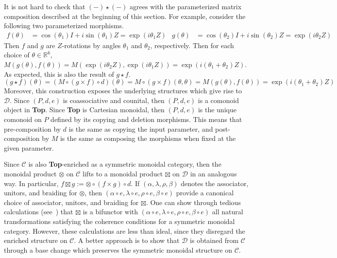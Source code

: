 It is not hard to check that $( - ) \star ( - )$ agrees with the parameterized matrix composition described at the beginning of this section.
For example, consider the following two parameterized morphisms.
\begin{align*}
    f( \theta ) &= \cos( \theta_1 ) I + i \sin( \theta_1 ) Z = \exp( i\theta_1 Z )
    &
    g( \theta ) &= \cos( \theta_2 ) I + i \sin( \theta_2 ) Z = \exp( i\theta_2 Z )
\end{align*}
Then $f$ and $g$ are $Z$-rotations by angles $\theta_1$ and $\theta_2$, respectively.
Then for each choice of $\theta \in \mathbb{R}^6$, $M( g( \theta ), f( \theta ) ) = M( \exp( i\theta_2 Z ), \exp( i\theta_1 Z ) ) = \exp( i (\theta_1 + \theta_2) Z )$.
As expected, this is also the result of $g \star f$.
\begin{equation*}
    ( g \star f )( \theta )
    =
    ( M \circ ( g \times f ) \circ d )( \theta )
    =
    M \circ ( g \times f )( \theta, \theta )
    =
    M( g( \theta ), f( \theta ) )
    =
    \exp( i ( \theta_1 + \theta_2 ) Z )
\end{equation*}
Moreover, this construction exposes the underlying structures which give rise to $\mathcal{D}$.
Since $( P, d, e )$ is coassociative and counital, then $( P, d, e )$ is a comonoid object in \textbf{Top}.
Since \textbf{Top} is Cartesian monoidal, then $( P, d, e )$ is the unique comonoid on $P$ defined by its copying and deletion morphisms.
This means that pre-composition by $d$ is the same as copying the input parameter, and post-composition by $M$ is the same as composing the morphisms when fixed at the given parameter.

Since $\mathcal{C}$ is also \textbf{Top}-enriched as a symmetric monoidal category, then the monoidal product $\otimes$ on $\mathcal{C}$ lifts to a monoidal product $\boxtimes$ on $\mathcal{D}$ in an analogous way.
In particular, $f \boxtimes g := \otimes \circ ( f \times g ) \circ d$.
If $( \alpha, \lambda, \rho, \beta )$ denotes the associator, unitors, and braiding for $\otimes$, then $( \alpha \circ e, \lambda \circ e, \rho \circ e, \beta \circ e )$ provide a canonical choice of associator, unitors, and braiding for $\boxtimes$.
One can show through tedious calculations (see~\cite{Wesley2025}) that $\boxtimes$ is a bifunctor with $( \alpha \circ e, \lambda \circ e, \rho \circ e, \beta \circ e )$ all natural transformations satisfying the coherence conditions for a symmetric monoidal category.
However, these calculations are less than ideal, since they disregard the enriched structure on $\mathcal{C}$.
A better approach is to show that $\mathcal{D}$ is obtained from $\mathcal{C}$ through a base change which preserves the symmetric monoidal structure on $\mathcal{C}$.

